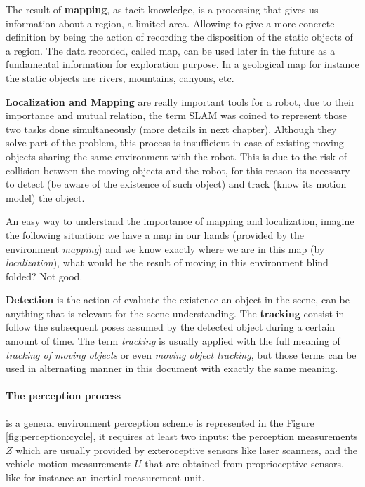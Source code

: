 The result of \textbf{mapping}, as tacit knowledge, is a processing that gives us information about a region, a limited area. Allowing to give a more concrete definition by being the action of recording the disposition of the static objects of a region. The data recorded, called map, can be used later in the future as a fundamental information for exploration purpose. In a geological map for instance the static objects are rivers, mountains, canyons, etc. 

\textbf{Localization and Mapping} are really important tools for a robot, due to their importance and mutual relation, the term SLAM was coined to represent those two tasks done simultaneously (more details in next chapter). Although they solve part of the problem, this process is insufficient in case of existing moving objects sharing the same environment with the robot. This is due to the risk of collision between the moving objects and the robot, for this reason its necessary to detect (be aware of the existence of such object) and track (know its motion model) the object.

An easy way to understand the importance of mapping and localization, imagine the following situation: we have a map in our hands (provided by the environment \textit{mapping}) and we know exactly where we are in this map (by \textit{localization}), what would be the result of moving in this environment blind folded? Not good.

\textbf{Detection} is the action of evaluate the existence an object in the scene, can be anything that is relevant for the scene understanding. The \textbf{tracking} consist in follow the subsequent poses assumed by the detected object during a certain amount of time. The term \textit{tracking} is usually applied with the full meaning of \textit{tracking of moving objects}\cite{Wang04a} or even \textit{moving object tracking}, but those terms can be used in alternating manner in this document with exactly the same meaning.

\paragraph{The perception process} is a general environment perception scheme is represented in the Figure \ref{fig:perception:cycle}, it requires at least two inputs: the perception measurements $Z$ which are usually provided by exteroceptive sensors like laser scanners, and the vehicle motion measurements $U$ that are obtained from proprioceptive sensors, like for instance an inertial measurement unit.

